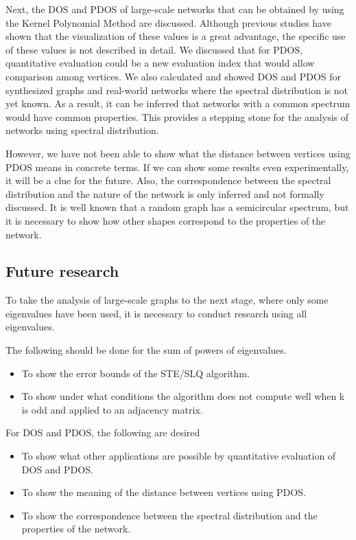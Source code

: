 \documentclass[senior,final,11pt]{iscs-thesis}
\begin{document}
Next, the DOS and PDOS of large-scale networks that can be obtained by using the Kernel Polynomial Method are discussed. Although previous studies have shown that the visualization of these values is a great advantage, the specific use of these values is not described in detail. We discussed that for PDOS, quantitative evaluation could be a new evaluation index that would allow comparison among vertices. We also calculated and showed DOS and PDOS for synthesized graphs and real-world networks where the spectral distribution is not yet known. As a result, it can be inferred that networks with a common spectrum would have common properties. This provides a stepping stone for the analysis of networks using spectral distribution.

However, we have not been able to show what the distance between vertices using PDOS means in concrete terms. If we can show some results even experimentally, it will be a clue for the future. Also, the correspondence between the spectral distribution and the nature of the network is only inferred and not formally discussed. It is well known that a random graph has a semicircular spectrum, but it is necessary to show how other shapes correspond to the properties of the network.

\subsection*{Future research}
To take the analysis of large-scale graphs to the next stage, where only some eigenvalues have been used, it is necessary to conduct research using all eigenvalues.

The following should be done for the sum of powers of eigenvalues.
\begin{itemize}
    \item To show the error bounds of the STE/SLQ algorithm.
    \item To show under what conditions the algorithm does not compute well when k is odd and applied to an adjacency matrix.
\end{itemize}

For DOS and PDOS, the following are desired
\begin{itemize}
    \item To show what other applications are possible by quantitative evaluation of DOS and PDOS.
    \item To show the meaning of the distance between vertices using PDOS.
    \item To show the correspondence between the spectral distribution and the properties of the network.
\end{itemize}




\appendix
\end{document}

